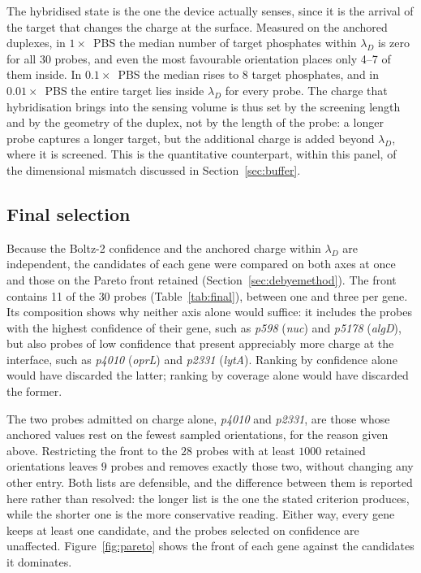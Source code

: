 The hybridised state is the one the device actually senses, since it is the arrival of the target
that changes the charge at the surface. Measured on the anchored duplexes, in $1\times$~PBS the median number of target phosphates within $\lambda_D$ is zero for
all $30$ probes, and even the most favourable orientation places only
4--7
of them inside. In $0.1\times$~PBS the median rises to $8$ target phosphates, and in $0.01\times$~PBS
the entire target lies inside $\lambda_D$ for every probe. The charge that hybridisation brings into
the sensing volume is thus set by the screening length and by the geometry of the duplex, not by the
length of the probe: a longer probe captures a longer target, but the additional charge is added
beyond $\lambda_D$, where it is screened. This is the quantitative counterpart, within this panel, of
the dimensional mismatch discussed in Section~\ref{sec:buffer}.

\subsection{Final selection}
\label{sec:final}

Because the Boltz-2 confidence and the anchored charge within $\lambda_D$ are independent, the
candidates of each gene were compared on both axes at once and those on the Pareto front retained
(Section~\ref{sec:debyemethod}). The front contains 11 of the $30$ probes
(Table~\ref{tab:final}), between one and three per gene. Its composition shows why neither axis alone
would suffice: it includes the probes with the highest confidence of their gene, such as
\emph{p598} (\emph{nuc}) and \emph{p5178} (\emph{algD}), but also probes of low confidence that
present appreciably more charge at the interface, such as \emph{p4010} (\emph{oprL}) and
\emph{p2331} (\emph{lytA}). Ranking by confidence alone would have discarded the latter; ranking by
coverage alone would have discarded the former.

The two probes admitted on charge alone, \emph{p4010} and \emph{p2331}, are those whose anchored
values rest on the fewest sampled orientations, for the reason given above. Restricting the front to
the $28$ probes with at least $1000$ retained orientations leaves $9$ probes and removes exactly
those two, without changing any other entry. Both lists are defensible, and the difference between
them is reported here rather than resolved: the longer list is the one the stated criterion
produces, while the shorter one is the more conservative reading. Either way, every gene keeps at
least one candidate, and the probes selected on confidence are unaffected.
Figure~\ref{fig:pareto} shows the front of each gene against the candidates it dominates.

